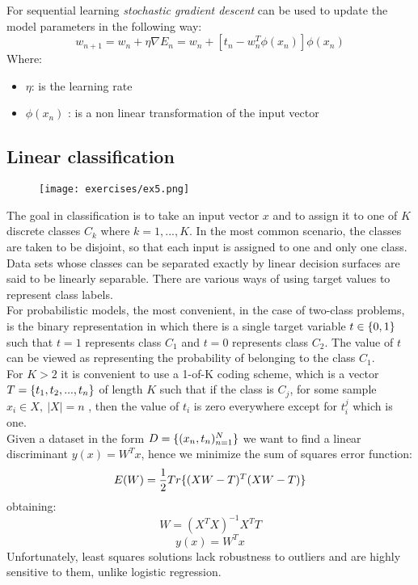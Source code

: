 For sequential learning \textit{stochastic gradient descent} can be used to update the model parameters in the following way:
\[w_{n+1}=w_n+\eta \nabla E_n= w_n +[t_n -w_n^T \phi(x_n)]\phi(x_n)\]
Where:
\begin{itemize}
\item $\eta$: is the learning rate 
\item $\phi(x_n)$ : is a non linear transformation of the input vector
\end{itemize}



\subsection{Linear classification}

\begin{figure}[H]
    \centering
    \texttt{[image: exercises/ex5.png]}
\end{figure}

The goal in classification is to take an input vector $x$ and to assign it to one of $K$  discrete classes $C_k$ where $k=1,...,K$. In the most common scenario, the classes are taken to be disjoint, so that each input is assigned to one and only one class. Data sets whose classes can be separated exactly by linear decision surfaces are said to be linearly separable. There are various ways of using target values to represent class labels.\\
For probabilistic models, the most convenient, in the case of two-class problems, is the binary representation in which there is a single target variable $t \in \lbrace{0,1}\rbrace$ such that $t=1$ represents class $C_1$  and $t=0$  represents class $C_2$. The value of $t$ can be viewed as representing the probability of belonging to the class $C_1$.\\
For $K>2$  it is convenient to use a 1-of-K coding scheme, which is a vector $T=\lbrace{t_1,t_2,...,t_n}\rbrace$ of length $K$ such that if the class is $C_j$, for some sample $x_i \in X,\ |X|=n$ , then the value of $t_i$ is zero everywhere except for $t_i^j$ which is one. \\
Given a dataset in the form $D=\lbrace{(x_n,t_n)^N_{n=1}}\rbrace$ we want to find a linear discriminant $y(x)=W^Tx$, hence we minimize the sum of squares error function:
\[E(W)=\frac{1}{2}Tr\lbrace{(XW-T)^T(XW-T)}\rbrace\]
obtaining:
\[W=(X^TX)^{-1}X^TT\]
\[y(x)=W^Tx\]
Unfortunately, least squares solutions lack robustness to outliers and are highly sensitive to them, unlike logistic regression.

